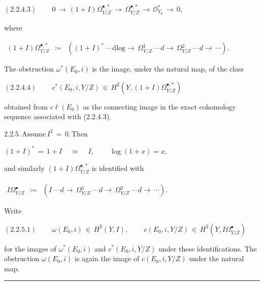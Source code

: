 \documentclass[9pt]{article}
\newcommand{\CanonText}[1]{\par{\fontsize{8.0}{9.35}\selectfont\RaggedRight #1\par}\vspace{2.2pt}}
\newcommand{\CanonDisplay}[1]{\par\vspace{1.2pt}\begin{center}{\fontsize{7.2}{8.4}\selectfont\(\displaystyle #1\)}\end{center}\vspace{1.2pt}}
\newenvironment{CanonMathBlock}{\par\vspace{1.2pt}\begin{center}\fontsize{6.8}{8.0}\selectfont\(\displaystyle}{\)\end{center}\vspace{1.2pt}}
\begin{document}
\begin{minipage}[t][\dimexpr\textheight-5pt\relax][t]{\textwidth}
\CanonDisplay{(2.2.4.3)\qquad\,0\,\to{}\,(1+I)\Omega{}^{\bullet{},*}_{Y/Z}\,\to{}\,\Omega{}^{\bullet{},*}_{Y/Z}\,\to{}\,\mathcal{O}_{Y_{0}}^{*}\,\to{}\,0,}
\CanonText{where}
\begin{CanonMathBlock}
\begin{array}{ccc}
(1+I)\Omega{}^{\bullet{},*}_{Y/Z} & \coloneqq{} & ((1+I)^{*}\,\text{---}\text{dlog}\to{}\,\Omega{}^{1}_{Y/Z}\,\text{---}d\to{}\,\Omega{}^{2}_{Y/Z}\,\text{---}d\to{}\,\cdots{}).
\end{array}
\end{CanonMathBlock}
\CanonText{The obstruction \(\omega{}^{*}(E_{0},i)\) is the image, under the natural map, of the class}
\CanonDisplay{(2.2.4.4)\qquad\,c^{*}(E_{0},i,Y/Z)\,\in{}\,H^{2}(Y,(1+I)\Omega{}^{\bullet{},*}_{Y/Z})}
\CanonText{obtained from \(c\ell{}(E_{0})\) as the connecting image in the exact cohomology sequence associated with (2.2.4.3).}
\CanonDisplay{2.2.5.\,\text{Assume}\,I^{2}\,=\,0.\,\text{Then}}
\CanonDisplay{(1+I)^{*}\,=\,1+I\quad\,\simeq{}\quad\,I,\qquad\,\operatorname{log}(1+x)=x,}
\CanonText{and similarly \((1+I)\Omega{}^{\bullet{},*}_{Y/Z}\) is identified with}
\begin{CanonMathBlock}
\begin{array}{ccc}
I\Omega{}^{\bullet{}}_{Y/Z} & \coloneqq{} & (I\,\text{---}d\to{}\,\Omega{}^{1}_{Y/Z}\,\text{---}d\to{}\,\Omega{}^{2}_{Y/Z}\,\text{---}d\to{}\,\cdots{}).
\end{array}
\end{CanonMathBlock}
\CanonText{Write}
\CanonDisplay{(2.2.5.1)\qquad\,\omega{}(E_{0},i)\,\in{}\,H^{2}(Y,I),\qquad\,c(E_{0},i,Y/Z)\,\in{}\,H^{2}(Y,I\Omega{}^{\bullet{}}_{Y/Z})}
\CanonText{for the images of \(\omega{}^{*}(E_{0},i)\) and \(c^{*}(E_{0},i,Y/Z)\) under these identifications. The obstruction \(\omega{}(E_{0},i)\) is again the image of \(c(E_{0},i,Y/Z)\) under the natural map.}
\vfill
{\color{Accent}\hrule height 0.35pt}\vspace{3pt}
\end{minipage}
\newpage
\end{document}
